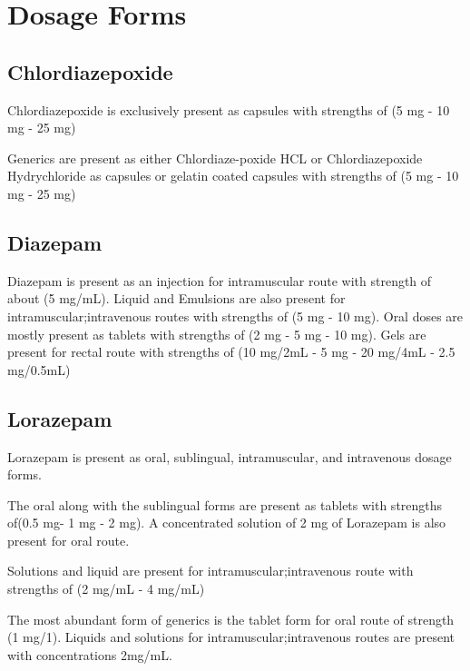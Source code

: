 \chapter{Dosage Forms}

\section{Chlordiazepoxide}
Chlordiazepoxide is exclusively present as capsules with strengths of (5 mg - 10 mg - 25 mg)

Generics are present as either Chlordiaze-poxide HCL or Chlordiazepoxide Hydrychloride as capsules or gelatin coated capsules with strengths of (5 mg - 10 mg - 25 mg)


\section{Diazepam}
Diazepam is present as an injection for intramuscular route with strength of about (5 mg/mL). Liquid and Emulsions are also present for intramuscular;intravenous routes with strengths of (5 mg - 10 mg). Oral doses are mostly present as tablets with strengths of (2 mg - 5 mg - 10 mg). Gels are present for rectal route with strengths of (10 mg/2mL - 5 mg - 20 mg/4mL - 2.5 mg/0.5mL)

\section{Lorazepam} 
Lorazepam is present as oral, sublingual, intramuscular, and intravenous dosage forms. 


The oral along with the sublingual forms are present as tablets with strengths of(0.5 mg- 1 mg - 2 mg). A concentrated solution of 2 mg of Lorazepam is also present for oral route.

Solutions and liquid are present for intramuscular;intravenous route with strengths of (2 mg/mL - 4 mg/mL)

The most abundant form of generics is the tablet form for oral route of strength (1 mg/1). Liquids and solutions for intramuscular;intravenous routes are present with concentrations 2mg/mL.

